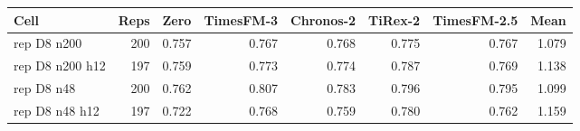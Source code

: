 \begin{tabular}{lrrrrrrr}
\toprule
Cell & Reps & Zero & TimesFM-3 & Chronos-2 & TiRex-2 & TimesFM-2.5 & Mean \\
\midrule
rep D8 n200 & 200 & 0.757 & 0.767 & 0.768 & 0.775 & 0.767 & 1.079 \\
rep D8 n200 h12 & 197 & 0.759 & 0.773 & 0.774 & 0.787 & 0.769 & 1.138 \\
rep D8 n48 & 200 & 0.762 & 0.807 & 0.783 & 0.796 & 0.795 & 1.099 \\
rep D8 n48 h12 & 197 & 0.722 & 0.768 & 0.759 & 0.780 & 0.762 & 1.159 \\
\bottomrule
\end{tabular}
